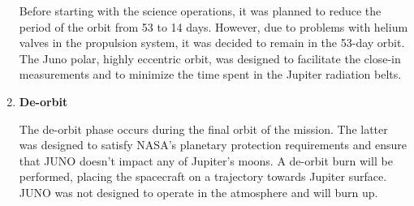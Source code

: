 \begin{enumerate}
    Before starting with the science operations, it was planned to reduce the period of the orbit from 53 to 14 days.
    However, due to problems with helium valves in the propulsion system, it was decided to remain in the 53-day orbit. The Juno polar, highly eccentric orbit, was designed to facilitate the close-in measurements and to minimize the time spent in the Jupiter radiation belts.

    \item \textbf{De-orbit}
    
    The de-orbit phase occurs during the final orbit of the mission. The latter was designed to satisfy NASA's planetary protection requirements and ensure that JUNO doesn't impact any of Jupiter's moons. A de-orbit burn will be performed, placing the spacecraft on a trajectory towards Jupiter surface.
    JUNO was not designed to operate in the atmosphere and will burn up.
    
     
\end{enumerate}